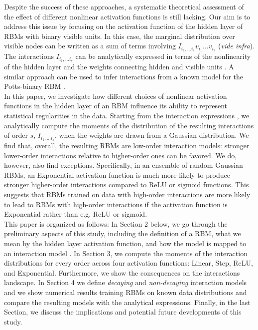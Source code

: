 \documentclass[11pt,letterpaper]{article}
\renewcommand{\red}[1]{#1}
\begin{document}
Despite the success of these approaches, a systematic theoretical assessment of the effect of different nonlinear activation functions is still lacking.
{\red Our aim is to address this issue by focusing on the activation function of the hidden layer of} RBMs with binary visible units. In this case, the marginal distribution over visible nodes can be written as a sum of terms involving $I_{i_1,\dots i_s} v_{i_1}\dots v_{i_s}$ {\red ({\it vide infra})}. The interactions $I_{i_1,\dots i_s}$ can be analytically expressed in terms of the nonlinearity of the hidden layer and the weights connecting hidden and visible units \cite{10.1162/neco_a_01420}. A similar approach can be used to infer interactions from a known model for the Potts-binary RBM \cite{decelle2024inferring}.\\
In this paper, we investigate how different choices of nonlinear activation functions in the hidden layer of an RBM influence its ability to represent statistical regularities in the data. Starting from the interaction expressions \cite{10.1162/neco_a_01420}, we analytically compute the moments of the distribution of the resulting interactions of order $s$, $I_{i_1,\dots i_s}$, {\red when the weights are drawn from a Gaussian distribution. We find that, overall, the resulting RBMs are low-order interaction models: stronger lower-order interactions relative to higher-order ones can be favored. We do, however, also find exceptions. Specifically, in an ensemble of random Gaussian RBMs,} an Exponential activation function is much more likely to produce stronger higher-order interactions compared to ReLU or sigmoid functions. This suggests that RBMs trained on data with high-order interactions are more likely to lead to RBMs with high-order interactions if the activation function is Exponential rather than e.g. ReLU or sigmoid.\\
This paper is organized as follows: In Section 2 below, we {\red go through the preliminary aspects of this study, including the definition of a} RBM, {\red what we mean by the hidden layer activation function, and how the model is mapped to an interaction model} \cite{10.1162/neco_a_01420}. In Section 3, we compute the moments of the interaction distributions for every order across four activation functions: Linear, Step, ReLU, and Exponential. Furthermore, we show the consequences on the interactions landscape. In Section 4 we define \textit{decaying} and \textit{non-decaying} interaction models and we show numerical results training RBMs on known data distributions and compare the resulting models with the analytical expressions. Finally, in the last Section, we discuss the implications and potential future developments of this study.
\end{document}
